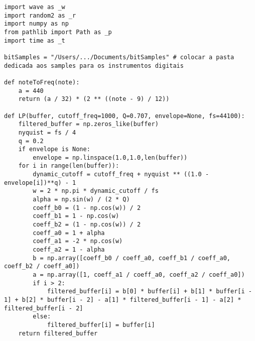 \documentclass[../main.tex]{subfiles}
\begin{document}
\begin{verbatim}
import wave as _w
import random2 as _r
import numpy as np
from pathlib import Path as _p
import time as _t

bitSamples = "/Users/.../Documents/bitSamples" # colocar a pasta dedicada aos samples para os instrumentos digitais

def noteToFreq(note):
    a = 440
    return (a / 32) * (2 ** ((note - 9) / 12))

def LP(buffer, cutoff_freq=1000, Q=0.707, envelope=None, fs=44100):
    filtered_buffer = np.zeros_like(buffer)
    nyquist = fs / 4
    q = 0.2
    if envelope is None:
        envelope = np.linspace(1.0,1.0,len(buffer))
    for i in range(len(buffer)):
        dynamic_cutoff = cutoff_freq + nyquist ** ((1.0 - envelope[i])**q) - 1
        w = 2 * np.pi * dynamic_cutoff / fs
        alpha = np.sin(w) / (2 * Q)
        coeff_b0 = (1 - np.cos(w)) / 2
        coeff_b1 = 1 - np.cos(w)
        coeff_b2 = (1 - np.cos(w)) / 2
        coeff_a0 = 1 + alpha
        coeff_a1 = -2 * np.cos(w)
        coeff_a2 = 1 - alpha
        b = np.array([coeff_b0 / coeff_a0, coeff_b1 / coeff_a0, coeff_b2 / coeff_a0])
        a = np.array([1, coeff_a1 / coeff_a0, coeff_a2 / coeff_a0])
        if i > 2:
            filtered_buffer[i] = b[0] * buffer[i] + b[1] * buffer[i - 1] + b[2] * buffer[i - 2] - a[1] * filtered_buffer[i - 1] - a[2] * filtered_buffer[i - 2]
        else:
            filtered_buffer[i] = buffer[i]
    return filtered_buffer


\end{verbatim}
\end{document}
